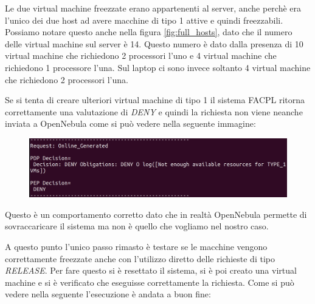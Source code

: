 Le due virtual machine freezzate erano appartenenti al server, anche perchè era l'unico dei due host ad avere macchine di tipo 1 attive e quindi freezzabili. Possiamo notare questo anche nella figura \ref{fig:full_hosts}, dato che il numero delle virtual machine sul server è 14. Questo numero è dato dalla presenza di 10 virtual machine che richiedono 2 processori l'uno e 4 virtual machine che richiedono 1 processore l'una. Sul laptop ci sono invece soltanto 4 virtual machine che richiedono 2 processori l'una.\par
Se si tenta di creare ulteriori virtual machine di tipo 1 il sistema FACPL ritorna correttamente una valutazione di \emph{DENY} e quindi la richiesta non viene neanche inviata a OpenNebula come si può vedere nella seguente immagine:
\begin{figure}[H]
    \centering
    \includegraphics[width=\textwidth]{tesi_screenshot/notEnoughResources.png}
\end{figure}
Questo è un comportamento corretto dato che in realtà OpenNebula permette di sovraccaricare il sistema ma non è quello che vogliamo nel nostro caso.\par
A questo punto l'unico passo rimasto è testare se le macchine vengono correttamente freezzate anche con l'utilizzo diretto delle richieste di tipo \emph{RELEASE}. Per fare questo si è resettato il sistema, si è poi creato una virtual machine e si è verificato che eseguisse correttamente la richiesta. Come si può vedere nella seguente l'esecuzione è andata a buon fine:

